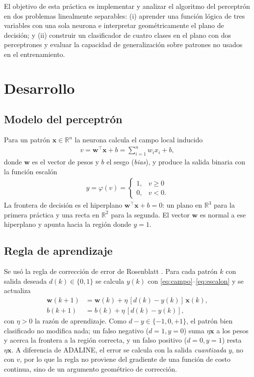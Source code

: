 \documentclass[conference]{IEEEtran}
\begin{document}
El objetivo de esta práctica es implementar y analizar el algoritmo del
perceptrón en dos problemas linealmente separables: (i) aprender una función
lógica de tres variables con una sola neurona e interpretar geométricamente
el plano de decisión; y (ii) construir un clasificador de cuatro clases en el
plano con dos perceptrones y evaluar la
capacidad de generalización sobre patrones no usados en el entrenamiento.

\section{Desarrollo}

\subsection{Modelo del perceptrón}
Para un patrón $\mathbf{x}\in\mathbb{R}^n$ la neurona calcula el campo local
inducido
\begin{align}
    \label{eq:campo}
    v = \mathbf{w}^\top\mathbf{x} + b = \sum_{i=1}^{n} w_i x_i + b,
\end{align}
donde $\mathbf{w}$ es el vector de pesos y $b$ el sesgo (\textit{bias}), y
produce la salida binaria con la función escalón
\begin{align}
    \label{eq:escalon}
    y=\varphi(v)=\begin{cases}1, & v\geq 0\\ 0, & v<0.\end{cases}
\end{align}
La frontera de decisión es el hiperplano $\mathbf{w}^\top\mathbf{x}+b=0$: un
plano en $\mathbb{R}^3$ para la primera práctica y una recta en
$\mathbb{R}^2$ para la segunda. El vector $\mathbf{w}$ es normal a ese
hiperplano y apunta hacia la región donde $y=1$.

\subsection{Regla de aprendizaje}
Se usó la regla de corrección de error de Rosenblatt \cite{b1}. Para cada
patrón $k$ con salida deseada $d(k)\in\{0,1\}$ se calcula $y(k)$ con
\eqref{eq:campo}--\eqref{eq:escalon} y se actualiza
\begin{align}
    \label{eq:updW}
    \mathbf{w}(k+1) &= \mathbf{w}(k) + \eta\,[d(k)-y(k)]\,\mathbf{x}(k),\\
    \label{eq:updb}
    b(k+1) &= b(k) + \eta\,[d(k)-y(k)],
\end{align}
con $\eta>0$ la razón de aprendizaje. Como $d-y\in\{-1,0,+1\}$, el patrón
bien clasificado no modifica nada; un falso negativo ($d=1,y=0$) suma
$\eta\mathbf{x}$ a los pesos y acerca la frontera a la región correcta, y un
falso positivo ($d=0,y=1$) resta $\eta\mathbf{x}$. A diferencia de ADALINE,
el error se calcula con la salida \emph{cuantizada} $y$, no con $v$, por lo que
la regla no proviene del gradiente de una función de costo continua, sino de
un argumento geométrico de corrección.
\end{document}
